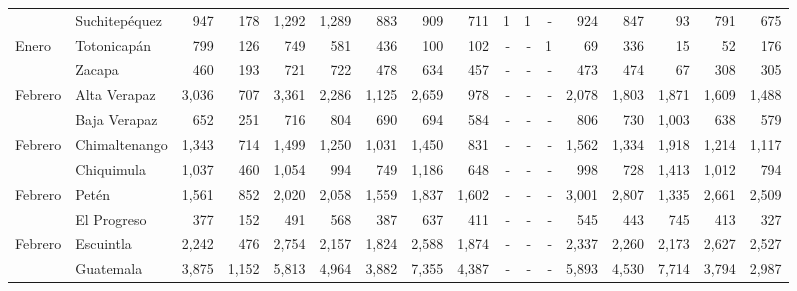 \begin{landscape}
\begin{center}
\begin{longtable}{llrrrrrrrrrrrrrrr}
			\rowcolor{color1!5!white}\multicolumn{1}{l}{	\footnotesize	 Enero 	}&	 Suchitepéquez 	&	 947 	&	 178 	&	 1,292 	&	 1,289 	&	 883 	&	 909 	&	 711 	&	 1 	&	 1 	&	 -   	&	 924 	&	 847 	&	 93 	&	 791 	&	 675 	\\
			\multicolumn{1}{l}{	\footnotesize	 Enero 	}&	 Totonicapán 	&	 799 	&	 126 	&	 749 	&	 581 	&	 436 	&	 100 	&	 102 	&	 -   	&	 -   	&	 1 	&	 69 	&	 336 	&	 15 	&	 52 	&	 176 	\\
			\rowcolor{color1!5!white}\multicolumn{1}{l}{	\footnotesize	 Enero 	}&	 Zacapa 	&	 460 	&	 193 	&	 721 	&	 722 	&	 478 	&	 634 	&	 457 	&	 -   	&	 -   	&	 -   	&	 473 	&	 474 	&	 67 	&	 308 	&	 305 	\\
			\multicolumn{1}{l}{	\footnotesize	 Febrero 	}&	 Alta Verapaz 	&	 3,036 	&	 707 	&	 3,361 	&	 2,286 	&	 1,125 	&	 2,659 	&	 978 	&	 -   	&	 -   	&	 -   	&	 2,078 	&	 1,803 	&	 1,871 	&	 1,609 	&	 1,488 	\\
			\rowcolor{color1!5!white}\multicolumn{1}{l}{	\footnotesize	 Febrero 	}&	 Baja Verapaz 	&	 652 	&	 251 	&	 716 	&	 804 	&	 690 	&	 694 	&	 584 	&	 -   	&	 -   	&	 -   	&	 806 	&	 730 	&	 1,003 	&	 638 	&	 579 	\\
			\multicolumn{1}{l}{	\footnotesize	 Febrero 	}&	 Chimaltenango 	&	 1,343 	&	 714 	&	 1,499 	&	 1,250 	&	 1,031 	&	 1,450 	&	 831 	&	 -   	&	 -   	&	 -   	&	 1,562 	&	 1,334 	&	 1,918 	&	 1,214 	&	 1,117 	\\
			\rowcolor{color1!5!white}\multicolumn{1}{l}{	\footnotesize	 Febrero 	}&	 Chiquimula 	&	 1,037 	&	 460 	&	 1,054 	&	 994 	&	 749 	&	 1,186 	&	 648 	&	 -   	&	 -   	&	 -   	&	 998 	&	 728 	&	 1,413 	&	 1,012 	&	 794 	\\
			\multicolumn{1}{l}{	\footnotesize	 Febrero 	}&	 Petén 	&	 1,561 	&	 852 	&	 2,020 	&	 2,058 	&	 1,559 	&	 1,837 	&	 1,602 	&	 -   	&	 -   	&	 -   	&	 3,001 	&	 2,807 	&	 1,335 	&	 2,661 	&	 2,509 	\\
			\rowcolor{color1!5!white}\multicolumn{1}{l}{	\footnotesize	 Febrero 	}&	 El Progreso 	&	 377 	&	 152 	&	 491 	&	 568 	&	 387 	&	 637 	&	 411 	&	 -   	&	 -   	&	 -   	&	 545 	&	 443 	&	 745 	&	 413 	&	 327 	\\
			\multicolumn{1}{l}{	\footnotesize	 Febrero 	}&	 Escuintla 	&	 2,242 	&	 476 	&	 2,754 	&	 2,157 	&	 1,824 	&	 2,588 	&	 1,874 	&	 -   	&	 -   	&	 -   	&	 2,337 	&	 2,260 	&	 2,173 	&	 2,627 	&	 2,527 	\\
			\rowcolor{color1!5!white}\multicolumn{1}{l}{	\footnotesize	 Febrero 	}&	 Guatemala 	&	 3,875 	&	 1,152 	&	 5,813 	&	 4,964 	&	 3,882 	&	 7,355 	&	 4,387 	&	 -   	&	 -   	&	 -   	&	 5,893 	&	 4,530 	&	 7,714 	&	 3,794 	&	 2,987 	\\

\end{longtable}
\end{center}
\end{landscape}
